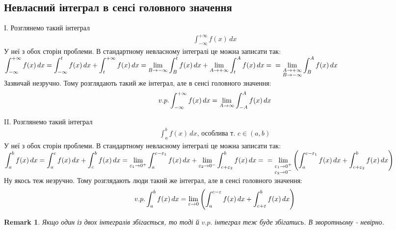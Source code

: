 \documentclass[a4paper, 10pt]{article}
\def\huge{\displaystyle}
\def\bigline{\vspace{5mm}\\}
\theoremstyle{theoremdd}
\theoremstyle{theoremdd}
\theoremstyle{theoremdd}
\theoremstyle{theoremdd}
\theoremstyle{theoremdd}
\theoremstyle{theoremdd}
\newtheorem{remark}[theorem]{Remark}
\theoremstyle{theoremdd}
\theoremstyle{theoremdd}
\begin{document}
\subsection{Невласний інтеграл в сенсі головного значення}
I. Розглянемо такий інтеграл
\begin{align*}
\int_{-\infty}^{+\infty} f(x)\,dx
\end{align*}
У неї з обох сторін проблеми. В стандартному невласному інтегралі це можна записати так:\\
$\huge\int_{-\infty}^{+\infty} f(x)\,dx = \huge\int_{-\infty}^{t} f(x)\,dx + \huge\int_{t}^{+\infty} f(x)\,dx = \lim_{B \to -\infty} \int_B^t f(x)\,dx + \lim_{A \to +\infty} \int_t^A f(x)\,dx = \\
= \lim_{\substack{A\to +\infty \\ B \to -\infty}} \int_B^A f(x)\,dx$\\
Зазвичай незручно. Тому розглядають такий же інтеграл, але в сенсі головного значення:
\begin{align*}
v.p. \int_{-\infty}^{+\infty} f(x)\,dx = \lim_{A \to \infty} \int_{-A}^A f(x)\,dx
\bigline
\end{align*}

II. Розглянемо такий інтеграл
\begin{align*}
\int_{a}^{b} f(x)\,dx \text{, особлива т. } c \in (a,b)
\end{align*}
У неї з обох сторін проблеми. В стандартному невласному інтегралі це можна записати так:\\
$\huge\int_{a}^{b} f(x)\,dx = \huge\int_{a}^{c} f(x)\,dx + \huge\int_{c}^{b} f(x)\,dx = \lim_{\varepsilon_1 \to 0^+} \int_a^{c-\varepsilon_1} f(x)\,dx + \lim_{\varepsilon_2 \to 0^-} \int_{c+\varepsilon_2}^b f(x)\,dx = \\
= \lim_{\substack{\varepsilon_1 \to 0^+ \\ \varepsilon_2 \to 0^-}} \left( \int_a^{c-\varepsilon_1} f(x)\,dx + \int_{c+\varepsilon_2}^b f(x)\,dx \right)$\\
Ну якось теж незручно. Тому розглядають люди такий же інтеграл, але в сенсі головного значення:
\begin{align*}
v.p. \int_{a}^{b} f(x)\,dx = \lim_{\varepsilon \to 0} \left( \int_{a}^{c-\varepsilon} f(x)\,dx + \int_{c+\varepsilon}^{b} f(x)\,dx \right)
\bigline
\end{align*}

\begin{remark}
Якщо один із двох інтегралів збігається, то тоді й $v.p.$ інтеграл теж буде збігатись. В зворотньому - невірно.
\end{remark}
\end{document}
